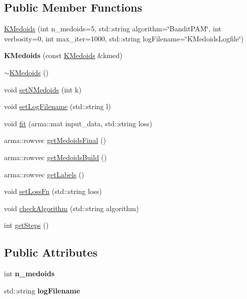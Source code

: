 \subsection*{Public Member Functions}
\begin{DoxyCompactItemize}
\item 
\hyperlink{classKMedoids_aa94dfc65454f847af5d08a2d7b816bb4}{K\+Medoids} (int n\+\_\+medoids=5, std\+::string algorithm=\char`\"{}Bandit\+P\+AM\char`\"{}, int verbosity=0, int max\+\_\+iter=1000, std\+::string log\+Filename=\char`\"{}K\+Medoids\+Logfile\char`\"{})
\item 
\mbox{\label{classKMedoids_a3d05d453ee8c395102ac9d20c91a9a12}} 
{\bfseries K\+Medoids} (const \hyperlink{classKMedoids}{K\+Medoids} \&kmed)
\item 
\hyperlink{classKMedoids_a82710100b6fb5820c10bc3f796ed62ff}{$\sim$\+K\+Medoids} ()
\item 
void \hyperlink{classKMedoids_a65760033bcae8de418d350c6fc4981da}{set\+N\+Medoids} (int k)
\item 
void \hyperlink{classKMedoids_a70de4f833f95a0256cce42284ebb3d48}{set\+Log\+Filename} (std\+::string l)
\item 
void \hyperlink{classKMedoids_ab68f7ee100ab2a15bc6ee0ba28f128ba}{fit} (arma\+::mat input\+\_\+data, std\+::string loss)
\item 
arma\+::rowvec \hyperlink{classKMedoids_a26aa9827d2541626d959dc984f0f9bcb}{get\+Medoids\+Final} ()
\item 
arma\+::rowvec \hyperlink{classKMedoids_a54370d8d0f5c500f5deb859a9eab891c}{get\+Medoids\+Build} ()
\item 
arma\+::rowvec \hyperlink{classKMedoids_a89474787892880381e4d0282de541d03}{get\+Labels} ()
\item 
void \hyperlink{classKMedoids_ab442bf7198be7a48a7eb5901ac7ca571}{set\+Loss\+Fn} (std\+::string loss)
\item 
void \hyperlink{classKMedoids_af5b9331755cd049afb05af8ecee3aeb5}{check\+Algorithm} (std\+::string algorithm)
\item 
int \hyperlink{classKMedoids_a2c8d55468ebe909229ea7bcdb50e8351}{get\+Steps} ()
\end{DoxyCompactItemize}
\subsection*{Public Attributes}
\begin{DoxyCompactItemize}
\item 
\mbox{\label{classKMedoids_a3365e728fd524c0be2fbab0b58e3a4cd}} 
int {\bfseries n\+\_\+medoids}
\item 
\mbox{\label{classKMedoids_a3cf57e612442072fb377b1714fc5e12e}} 
std\+::string {\bfseries log\+Filename}
\end{DoxyCompactItemize}



